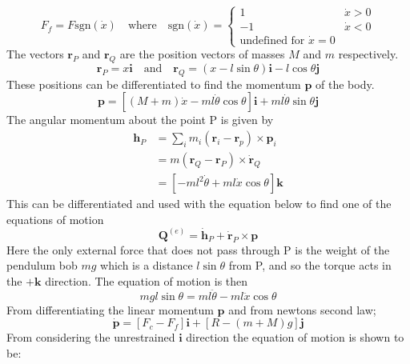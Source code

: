 \documentclass{article}
\begin{document}
\begin{equation}
  F_f = F \text{sgn}(\dot{x}) \quad \text{where} \quad \text{sgn}(\dot{x}) = \begin{cases} 1 & \dot{x} > 0 \\ -1 & \dot{x} < 0 \\ \text{undefined for } \dot{x} = 0 & \end{cases}
\end{equation}
The vectors $\mathbf{r}_P$ and $\mathbf{r}_Q$ are the position vectors of masses $M$ and $m$ respectively.
\begin{equation}
  \mathbf{r}_P = x \mathbf{i} \quad \text{and} \quad \mathbf{r}_Q = (x-l\sin\theta) \mathbf{i} - l\cos\theta \mathbf{j}
\end{equation}
These positions can be differentiated to find the momentum $\mathbf{p}$ of the body.
\begin{equation}
  \mathbf{p} = \left[(M+m)\dot{x}-ml\dot{\theta}\cos\theta \right] \mathbf{i} + ml\dot{\theta}\sin\theta\mathbf{j}
  \label{eq:trolly_momentum}
\end{equation}
The angular momentum about the point P is given by
\begin{align}
  \mathbf{h}_P &= \sum_i m_i(\mathbf{r}_i - \mathbf{r}_p) \times \mathbf{p}_i \\
  &= m (\mathbf{r}_Q - \mathbf{r}_P) \times \dot{\mathbf{r}}_Q \\
  &= \left[ -ml^2\dot{\theta} + ml\dot{x}\cos\theta \right] \mathbf{k}
\end{align}
This can be differentiated and used with the equation below to find one of the equations of motion 
\begin{equation}
  \mathbf{Q}^{(e)} = \dot{\mathbf{h}}_P + \dot{\mathbf{r}}_P \times \mathbf{p}
\end{equation}
Here the only external force that does not pass through P is the weight of the pendulum bob $mg$ which is a distance $l\sin\theta$ from P,
and so the torque acts in the $+\mathbf{k}$ direction. The equation of motion is then
\begin{equation}
  mgl\sin\theta = ml\ddot{\theta} - ml\ddot{x}\cos\theta
  \label{eq:angular_momentum_deriv_eq}
\end{equation}
From differentiating the linear momentum $\mathbf{p}$ and from newtons second law;
\begin{equation}
  \dot{\mathbf{p}} = \left[F_c - F_f \right] \mathbf{i} + \left[ R - (m+M)g \right]\mathbf{j}
\end{equation}
From considering the unrestrained $\mathbf{i}$ direction the equation of motion is shown to be:
\end{document}
